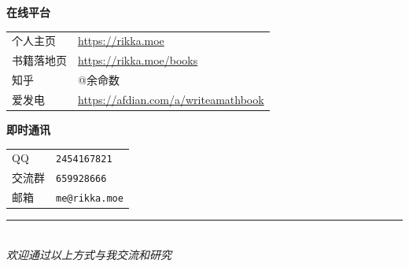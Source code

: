 \noindent
\begin{minipage}[t]{0.55\textwidth}

  {\small\sffamily\bfseries 在线平台}\\[0.3em]
  {\small
    \begin{tabular}{@{}ll@{}}
      个人主页 & \url{https://rikka.moe} \\
      书籍落地页 & \url{https://rikka.moe/books} \\
      知乎 & @余命数 \\
      爱发电 & \url{https://afdian.com/a/writeamathbook}
    \end{tabular}
  }

  \vspace{0.8em}

  {\small\sffamily\bfseries 即时通讯}\\[0.3em]
  {\small
    \begin{tabular}{@{}ll@{}}
      QQ & \texttt{2454167821} \\
      交流群 & \texttt{659928666} \\
      邮箱 & \texttt{me@rikka.moe}
    \end{tabular}
  }

\end{minipage}%

\vfill

\begin{center}
  \rule{0.4\textwidth}{0.5pt}\\[0.5em]
  {\small\itshape 欢迎通过以上方式与我交流和研究}
\end{center}

\cleardoublepage
